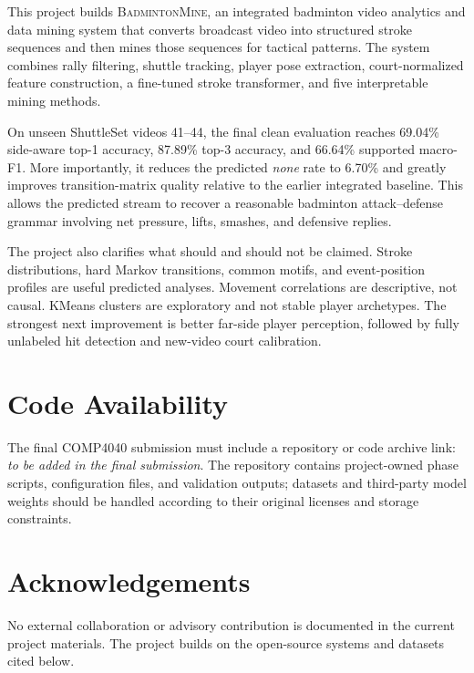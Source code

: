 \documentclass{article}
\newcommand{\method}{\textsc{BadmintonMine}}
\newcommand{\codeurl}{\textit{to be added in the final submission}}
\begin{document}
This project builds \method, an integrated badminton video analytics and data
mining system that converts broadcast video into structured stroke sequences
and then mines those sequences for tactical patterns. The system combines
rally filtering, shuttle tracking, player pose extraction, court-normalized
feature construction, a fine-tuned stroke transformer, and five interpretable
mining methods.

On unseen ShuttleSet videos 41--44, the final clean evaluation reaches
69.04\% side-aware top-1 accuracy, 87.89\% top-3 accuracy, and 66.64\%
supported macro-F1. More importantly, it reduces the predicted \emph{none}
rate to 6.70\% and greatly improves transition-matrix quality relative to the
earlier integrated baseline. This allows the predicted stream to recover a
reasonable badminton attack--defense grammar involving net pressure, lifts,
smashes, and defensive replies.

The project also clarifies what should and should not be claimed. Stroke
distributions, hard Markov transitions, common motifs, and event-position
profiles are useful predicted analyses. Movement correlations are descriptive,
not causal. KMeans clusters are exploratory and not stable player archetypes.
The strongest next improvement is better far-side player perception, followed
by fully unlabeled hit detection and new-video court calibration.

\section*{Code Availability}

The final COMP4040 submission must include a repository or code archive link:
\codeurl. The repository contains project-owned phase scripts, configuration
files, and validation outputs; datasets and third-party model weights should
be handled according to their original licenses and storage constraints.

\section*{Acknowledgements}

No external collaboration or advisory contribution is documented in the
current project materials. The project builds on the open-source systems and
datasets cited below.



\end{document}
